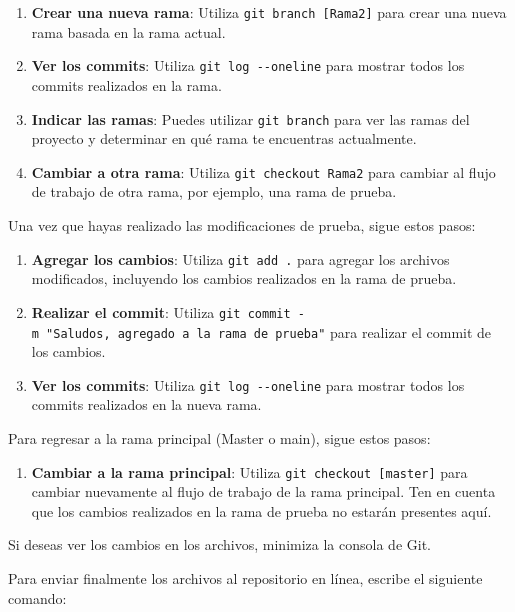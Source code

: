 \documentclass[
  a4paper,
]{article}
\providecommand{\tightlist}{%
  \setlength{\itemsep}{0pt}\setlength{\parskip}{0pt}}\usepackage{longtable,booktabs,array}
\begin{document}
\begin{enumerate}
\def\labelenumi{\arabic{enumi}.}
\item
  \textbf{Crear una nueva rama}: Utiliza
  \texttt{git\ branch\ {[}Rama2{]}} para crear una nueva rama basada en
  la rama actual.
\item
  \textbf{Ver los commits}: Utiliza \texttt{git\ log\ -\/-oneline} para
  mostrar todos los commits realizados en la rama.
\item
  \textbf{Indicar las ramas}: Puedes utilizar \texttt{git\ branch} para
  ver las ramas del proyecto y determinar en qué rama te encuentras
  actualmente.
\item
  \textbf{Cambiar a otra rama}: Utiliza \texttt{git\ checkout\ Rama2}
  para cambiar al flujo de trabajo de otra rama, por ejemplo, una rama
  de prueba.
\end{enumerate}

Una vez que hayas realizado las modificaciones de prueba, sigue estos
pasos:

\begin{enumerate}
\def\labelenumi{\arabic{enumi}.}
\setcounter{enumi}{4}
\item
  \textbf{Agregar los cambios}: Utiliza \texttt{git\ add\ .} para
  agregar los archivos modificados, incluyendo los cambios realizados en
  la rama de prueba.
\item
  \textbf{Realizar el commit}: Utiliza
  \texttt{git\ commit\ -m\ "Saludos,\ agregado\ a\ la\ rama\ de\ prueba"}
  para realizar el commit de los cambios.
\item
  \textbf{Ver los commits}: Utiliza \texttt{git\ log\ -\/-oneline} para
  mostrar todos los commits realizados en la nueva rama.
\end{enumerate}

Para regresar a la rama principal (Master o main), sigue estos pasos:

\begin{enumerate}
\def\labelenumi{\arabic{enumi}.}
\tightlist
\item
  \textbf{Cambiar a la rama principal}: Utiliza
  \texttt{git\ checkout\ {[}master{]}} para cambiar nuevamente al flujo
  de trabajo de la rama principal. Ten en cuenta que los cambios
  realizados en la rama de prueba no estarán presentes aquí.
\end{enumerate}

Si deseas ver los cambios en los archivos, minimiza la consola de Git.

Para enviar finalmente los archivos al repositorio en línea, escribe el
siguiente comando:
\end{document}
